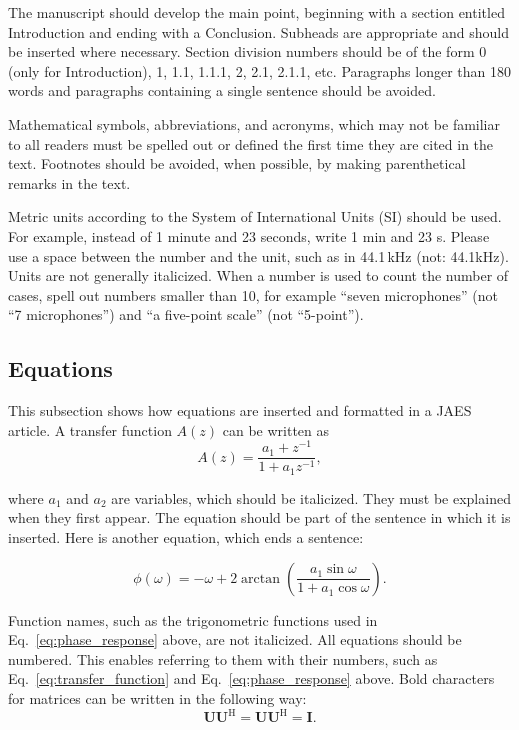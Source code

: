 \documentclass[fleqn]{jaes}
\begin{document}
The manuscript should develop the main point, beginning with a section entitled Introduction and ending with a Conclusion. Subheads are appropriate and should be inserted where necessary. Section division numbers should be of the form 0 (only for Introduction), 1, 1.1, 1.1.1, 2, 2.1, 2.1.1, etc. Paragraphs longer than 180 words and paragraphs containing a single sentence should be avoided.

Mathematical symbols, abbreviations, and acronyms, which may not be familiar to all readers must be spelled out or defined the first time they are cited in the text. Footnotes should be avoided, when possible, by making parenthetical remarks in the text.

Metric units according to the System of International Units (SI) should be used. For example, instead of 1 minute and 23 seconds, write 1 min and 23 s. Please use a space between the number and the unit, such as in 44.1\,kHz (not: 44.1kHz). Units are not generally italicized. When a number is used to count the number of cases, spell out numbers smaller than 10, for example “seven microphones” (not “7 microphones”) and “a five-point scale” (not “5-point”). 

\subsection{Equations}
This subsection shows how equations are inserted and formatted in a JAES article. A transfer function $A(z)$ can be written as
\begin{equation}
A(z) = \frac{{a_1  + z^{ - 1} }}{{1 + a_1 z^{ - 1} }},
\label{eq:transfer_function}
\end{equation}

\noindent where $a_1$ and $a_2$ are variables, which should be italicized. They must be explained when they first appear. The equation should be part of the sentence in which it is inserted. Here is another equation, which ends a sentence: 

\begin{equation}
\phi (\omega ) =  - \omega  + 2 \arctan \left( {\frac{{a_1 \sin \omega }}{{1 + a_1 \cos \omega }}} \right).
\label{eq:phase_response}
\end{equation}
 
\noindent Function names, such as the trigonometric functions used in Eq.~\eqref{eq:phase_response} above, are not italicized. All equations should be numbered. This enables referring to them with their numbers, such as Eq.~\eqref{eq:transfer_function} and Eq.~\eqref{eq:phase_response} above. Bold characters for matrices can be written in the following way:
\begin{equation}
\mathbf{U}\mathbf{U}^\mathrm{H} = \mathbf{U}\mathbf{U}^\mathrm{H} = \mathbf{I}.
\end{equation}
\end{document}
